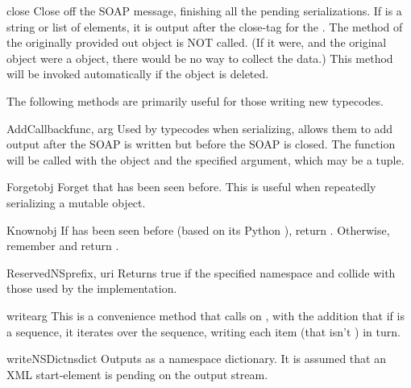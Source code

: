 \begin{methoddesc}{close}{}
Close off the SOAP message, finishing all the pending serializations.
If  is a string or list of elements, it is output after the
close-tag for the .
The  method of the originally provided out object is NOT called.
(If it were, and the original  object were a 
object, there would be no way to collect the data.)
This method will be invoked automatically if the object is deleted.
\end{methoddesc}

The following methods are primarily useful for those writing new typecodes.

\begin{methoddesc}{AddCallback}{func, arg}
Used by typecodes when serializing, allows them to add output after
the SOAP  is written but before the SOAP  is closed.
The function 
will be called with the  object and the specified 
argument, which may be a tuple.
\end{methoddesc}

\begin{methoddesc}{Forget}{obj}
Forget that  has been seen before.
This is useful when repeatedly serializing a mutable object.
\end{methoddesc}

\begin{methoddesc}{Known}{obj}
If  has been seen before (based on its Python ),
return .
Otherwise, remember  and return .
\end{methoddesc}

\begin{methoddesc}{ReservedNS}{prefix, uri}
Returns true if the specified namespace  and
collide with those used by the implementation.
\end{methoddesc}

\begin{methoddesc}{write}{arg}
This is a convenience method that calls 
on , with the addition that if  is a sequence,
it iterates over the sequence, writing each item (that isn't )
in turn.
\end{methoddesc}

\begin{methoddesc}{writeNSDict}{nsdict}
Outputs  as a namespace dictionary.
It is assumed that an XML start-element is pending on the output
stream.
\end{methoddesc}

